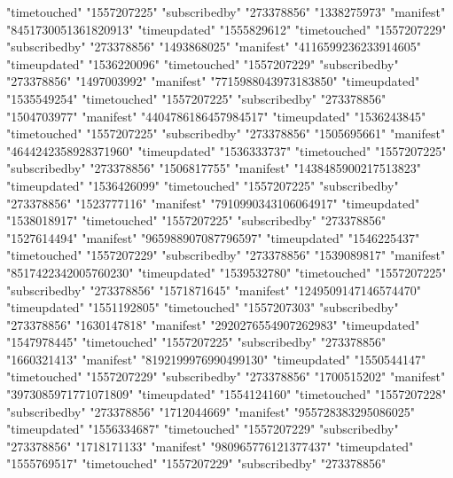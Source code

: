 {{{			"timetouched"		"1557207225"
			"subscribedby"		"273378856"
		}
		"1338275973"
		{
			"manifest"		"8451730051361820913"
			"timeupdated"		"1555829612"
			"timetouched"		"1557207229"
			"subscribedby"		"273378856"
		}
		"1493868025"
		{
			"manifest"		"4116599236233914605"
			"timeupdated"		"1536220096"
			"timetouched"		"1557207229"
			"subscribedby"		"273378856"
		}
		"1497003992"
		{
			"manifest"		"7715988043973183850"
			"timeupdated"		"1535549254"
			"timetouched"		"1557207225"
			"subscribedby"		"273378856"
		}
		"1504703977"
		{
			"manifest"		"4404786186457984517"
			"timeupdated"		"1536243845"
			"timetouched"		"1557207225"
			"subscribedby"		"273378856"
		}
		"1505695661"
		{
			"manifest"		"4644242358928371960"
			"timeupdated"		"1536333737"
			"timetouched"		"1557207225"
			"subscribedby"		"273378856"
		}
		"1506817755"
		{
			"manifest"		"1438485900217513823"
			"timeupdated"		"1536426099"
			"timetouched"		"1557207225"
			"subscribedby"		"273378856"
		}
		"1523777116"
		{
			"manifest"		"7910990343106064917"
			"timeupdated"		"1538018917"
			"timetouched"		"1557207225"
			"subscribedby"		"273378856"
		}
		"1527614494"
		{
			"manifest"		"965988907087796597"
			"timeupdated"		"1546225437"
			"timetouched"		"1557207229"
			"subscribedby"		"273378856"
		}
		"1539089817"
		{
			"manifest"		"8517422342005760230"
			"timeupdated"		"1539532780"
			"timetouched"		"1557207225"
			"subscribedby"		"273378856"
		}
		"1571871645"
		{
			"manifest"		"1249509147146574470"
			"timeupdated"		"1551192805"
			"timetouched"		"1557207303"
			"subscribedby"		"273378856"
		}
		"1630147818"
		{
			"manifest"		"2920276554907262983"
			"timeupdated"		"1547978445"
			"timetouched"		"1557207225"
			"subscribedby"		"273378856"
		}
		"1660321413"
		{
			"manifest"		"8192199976990499130"
			"timeupdated"		"1550544147"
			"timetouched"		"1557207229"
			"subscribedby"		"273378856"
		}
		"1700515202"
		{
			"manifest"		"3973085971771071809"
			"timeupdated"		"1554124160"
			"timetouched"		"1557207228"
			"subscribedby"		"273378856"
		}
		"1712044669"
		{
			"manifest"		"955728383295086025"
			"timeupdated"		"1556334687"
			"timetouched"		"1557207229"
			"subscribedby"		"273378856"
		}
		"1718171133"
		{
			"manifest"		"980965776121377437"
			"timeupdated"		"1555769517"
			"timetouched"		"1557207229"
			"subscribedby"		"273378856"
		}
	}
}
